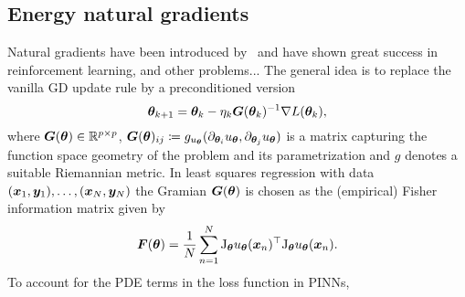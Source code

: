\subsection{Energy natural gradients}


Natural gradients have been introduced by~\citet{amari1998natural} and have shown great success in reinforcement learning, and other problems...
The general idea is to replace the vanilla GD update rule by a preconditioned version
    \[ {\bm{\theta}}_{k+1} = {\bm{\theta}}_k - \eta_k {\bm{G}}({\bm{\theta}}_k)^{-1} \nabla L({\bm{\theta}}_k), \]
where ${\bm{G}}({\bm{\theta}})\in\mathbb R^{p\times p}$, ${\bm{G}}({\bm{\theta}})_{ij} \coloneqq g_{u_{\bm{\theta}}}(\partial_{{\bm{\theta}}_i} u_{\bm{\theta}}, \partial_{{\bm{\theta}}_j} u_{\bm{\theta}})$ is a matrix capturing the function space geometry of the problem and its parametrization and $g$ denotes a suitable Riemannian metric. 
In least squares regression with data $({\bm{x}}_1, {\bm{y}}_1), \dots, ({\bm{x}}_N, {\bm{y}}_N)$ the Gramian ${\bm{G}}({\bm{\theta}})$ is chosen as the (empirical) Fisher information matrix given by~\citep{martens2020new, eschenhagen2023kroneckerfactored} 
\begin{equation}
  {\bm{F}}({\bm{\theta}}) = \frac1N\sum_{n=1}^N \mathrm{J}_{{\bm{\theta}}} u_{{\bm{\theta}}}({\bm{x}}_n)^\top \mathrm{J}_{{\bm{\theta}}} u_{{\bm{\theta}}}({\bm{x}}_n)
  .
\end{equation}
To account for the PDE terms in the loss function in PINNs, 
